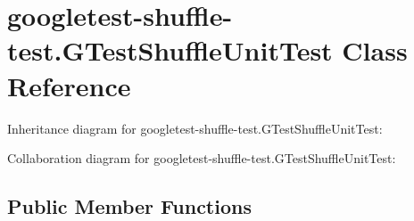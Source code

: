 \hypertarget{classgoogletest-shuffle-test_1_1GTestShuffleUnitTest}{}\section{googletest-\/shuffle-\/test.G\+Test\+Shuffle\+Unit\+Test Class Reference}
\label{classgoogletest-shuffle-test_1_1GTestShuffleUnitTest}


Inheritance diagram for googletest-\/shuffle-\/test.G\+Test\+Shuffle\+Unit\+Test\+:


Collaboration diagram for googletest-\/shuffle-\/test.G\+Test\+Shuffle\+Unit\+Test\+:
\subsection*{Public Member Functions}
